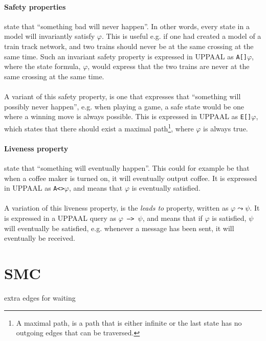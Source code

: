 \paragraph{Safety properties} state that ``something bad will never happen''. In other words, every state in a model will invariantly satisfy $\varphi$. This is useful e.g. if one had created a model of a train track network, and two trains should never be at the same crossing at the same time. Such an invariant safety property is expressed in UPPAAL as \texttt{A[]$\varphi$}, where the state formula, $\varphi$, would express that the two trains are never at the same crossing at the same time.\\\\
A variant of this safety property, is one that expresses that ``something will possibly never happen'', e.g. when playing a game, a safe state would be one where a winning move is always possible. This is expressed in UPPAAL as \texttt{E[]$\varphi$}, which states that there should exist a maximal path\footnote{A maximal path, is a path that is either infinite or the last state has no outgoing edges that can be traversed.}, where $\varphi$ is always true.
\paragraph{Liveness property} state that ``something will eventually happen''. This could for example be that when a coffee maker is turned on, it will eventually output coffee. It is expressed in UPPAAL as \texttt{A<>$\varphi$}, and means that $\varphi$ is eventually satisfied.\\\\
A variation of this liveness property, is the \textit{leads to} property, written as $\varphi \leadsto \psi$. It is expressed in a UPPAAL query as \texttt{$\varphi$ --> $\psi$}, and means that if $\varphi$ is satisfied, $\psi$ will eventually be satisfied, e.g. whenever a message has been sent, it will eventually be received.
\section{SMC}
extra edges for waiting